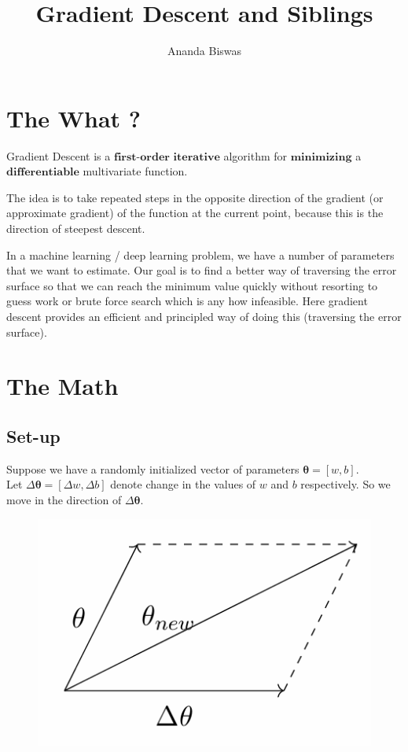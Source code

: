 \documentclass[11pt, a4paper]{article}
\title{Gradient Descent and Siblings}
\author{Ananda Biswas}
\date{}
\begin{document}
\maketitle

\tableofcontents

\newpage

\section{The What ?}

Gradient Descent is a $\textbf{first-order}$ $\textbf{iterative}$ algorithm for $\textbf{minimizing}$ a $\textbf{differentiable}$ multivariate function.

The idea is to take repeated steps in the opposite direction of the gradient (or approximate gradient) of the function at the current point, because this is the direction of steepest descent.

In a machine learning / deep learning problem, we have a number of parameters that we want to estimate. Our goal is to find a better way of traversing the error surface so that we can reach the minimum value quickly without resorting to guess work or brute force search which is any how infeasible. Here gradient descent provides an efficient and principled way of doing this (traversing the error surface).

\section{The Math}

\subsection{Set-up}

Suppose we have a randomly initialized vector of parameters $\boldsymbol{\theta} = \left[ w, b \right]$. \\[0.5em]

Let $\Delta\boldsymbol{\theta} = \left[ \Delta w, \Delta b \right]$ denote change in the values of $w$ and $b$ respectively. So we move in the direction of $\Delta\boldsymbol{\theta}$.

\begin{figure}[!htbp]
\centering
\includegraphics[scale=0.7]{image_1}
\end{figure}
\end{document}
